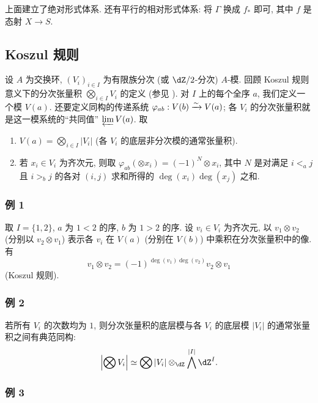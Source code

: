 \subsubsection{}\label{IV:1-2-6}

上面建立了绝对形式体系. 还有平行的相对形式体系:
将 $\Gamma$ 换成 $f_*$ 即可, 其中 $f$ 是态射 $X\to S$.

\subsection{Koszul 规则}\label{IV:1-3}

设 $A$ 为交换环, $(V_i)_{i\in I}$ 为有限族分次 (或 $\dZ/2$-分次) $A$-模.
回顾 Koszul 规则意义下的分次张量积 $\bigotimes_{i\in I} V_i$ 的定义
(参见 \cite[XVII 1.1]{sga4}). 对 $I$ 上的每个全序 $a$, 我们定义一个模 $V(a)$.
还要定义同构的传递系统 $\varphi_{a b}:V(b)\xrightarrow\sim V(a)$;
各 $V_i$ 的分次张量积就是这一模系统的“共同值” $\varprojlim V(a)$. 取
\begin{enumerate}[\indent a)]
  \item $V(a) = \bigotimes_{i\in I} |V_i|$ (各 $V_i$ 的底层非分次模的通常张量积).
  \item 若 $x_i\in V_i$ 为齐次元, 则取
    $\varphi_{a b}(\otimes x_i) = (-1)^N \otimes x_i$,
    其中 $N$ 是对满足 $i<_a j$ 且 $i>_b j$ 的各对 $(i,j)$ 求和所得的 $\deg(x_i)\deg(x_j)$ 之和.
\end{enumerate}

\subsubsection*{\hypertarget{sga4half.e04.example.1-3-1}{例 1}}

取 $I=\{1,2\}$, $a$ 为 $1<2$ 的序, $b$ 为 $1>2$ 的序.
设 $v_i\in V_i$ 为齐次元, 以 $v_1\otimes v_2$ (分别以 $v_2\otimes v_1$)
表示各 $v_i$ 在 $V(a)$ (分别在 $V(b)$) 中乘积在分次张量积中的像. 有
\[
  v_1\otimes v_2 = (-1)^{\deg(v_1)\deg(v_2)} v_2\otimes v_1
\]
(Koszul 规则).

\subsubsection*{\hypertarget{sga4half.e04.example.1-3-2}{例 2}}

若所有 $V_i$ 的次数均为 $1$, 则分次张量积的底层模与各 $V_i$ 的底层模 $|V_i|$ 的通常张量积之间有典范同构:
\[
  \left|\bigotimes V_i\right| \simeq \bigotimes |V_i|\otimes_{\dZ}\bigwedge^{|I|}\dZ^I \text{.}
\]

\subsubsection*{\hypertarget{sga4half.e04.example.1-3-3}{例 3}}


